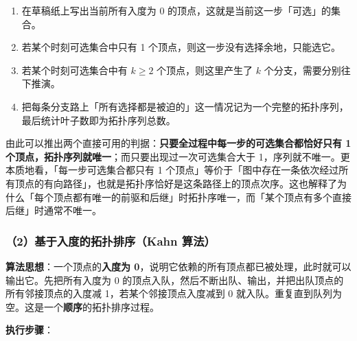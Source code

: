 \documentclass[11pt,openany,UTF8]{ctexbook}
\begin{document}
\begin{enumerate}
\item 在草稿纸上写出当前所有入度为 0 的顶点，这就是当前这一步「可选」的集合。
\item 若某个时刻可选集合中只有 1 个顶点，则这一步没有选择余地，只能选它。
\item 若某个时刻可选集合中有 $k\ge 2$ 个顶点，则这里产生了 $k$ 个分支，需要分别往下推演。
\item 把每条分支路上「所有选择都是被迫的」这一情况记为一个完整的拓扑序列，最后统计叶子数即为拓扑序列总数。
\end{enumerate}
由此可以推出两个直接可用的判据：\textbf{只要全过程中每一步的可选集合都恰好只有 1 个顶点，拓扑序列就唯一}；而只要出现过一次可选集合大于 1，序列就不唯一。更本质地看，「每一步可选集合都只有 1 个顶点」等价于「图中存在一条依次经过所有顶点的有向路径」，也就是拓扑序恰好是这条路径上的顶点次序。这也解释了为什么「每个顶点都有唯一的前驱和后继」时拓扑序唯一，而「某个顶点有多个直接后继」时通常不唯一。

\subsubsection{（2）基于入度的拓扑排序（Kahn 算法）}

\textbf{算法思想}：一个顶点的\textbf{入度为 0}，说明它依赖的所有顶点都已被处理，此时就可以输出它。先把所有入度为 0 的顶点入队，然后不断出队、输出，并把出队顶点的所有邻接顶点的入度减 1，若某个邻接顶点入度减到 0 就入队。重复直到队列为空。这是一个\textbf{顺序}的拓扑排序过程。

\textbf{执行步骤}：
\end{document}
